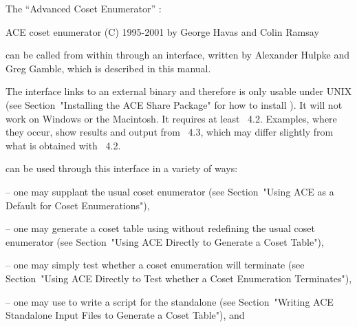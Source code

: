 

The ``Advanced Coset Enumerator'' {\ACE}:

\begintt
ACE coset enumerator (C) 1995-2001 by George Havas and Colin Ramsay
\endtt
{}

can  be called  from within  {\GAP} through  an interface,  written by
Alexander Hulpke and Greg Gamble, which is described in this manual.

The interface links to an external binary and therefore is only usable
under UNIX (see Section~"Installing the ACE Share Package" for how  to
install {\ACE}).  It will not work  on  Windows  or the Macintosh.  It
requires at least {\GAP}~4.2. Examples, where they occur, show results
and output from {\GAP}~4.3, which may differ  slightly  from  what  is
obtained with {\GAP}~4.2.

{\ACE} can be used through this interface in a variety  of  ways:

\beginlist

\item{--} one may supplant the  usual  {\GAP}  coset  enumerator  (see
Section~"Using ACE as a Default for Coset Enumerations"),

\item{--}  one  may  generate  a  coset  table  using  {\ACE}  without
redefining the usual {\GAP} coset enumerator (see  Section~"Using  ACE
Directly to Generate a Coset Table"),

\item{--} one  may  simply  test  whether  a  coset  enumeration  will
terminate (see Section~"Using ACE Directly to  Test  whether  a  Coset
Enumeration Terminates"),

\item{--} one may  use  {\GAP}  to  write  a  script  for  the  {\ACE}
standalone  (see  Section~"Writing  ACE  Standalone  Input  Files   to
Generate a Coset Table"), and

